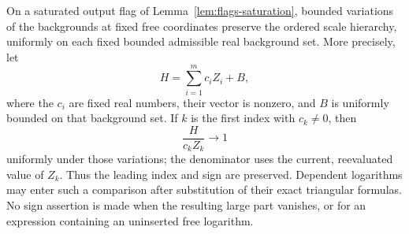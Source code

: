\begin{lemma}
\label{lem:flags-stability}
On a saturated output flag of Lemma~\ref{lem:flags-saturation}, bounded
variations of the backgrounds at fixed free coordinates preserve the ordered scale hierarchy,
uniformly on each fixed bounded admissible real background set. More
precisely, let
\[
 H=\sum_{i=1}^m c_iZ_i+B,
\]
where the $c_i$ are fixed real numbers, their vector is nonzero,
and $B$ is uniformly bounded on that background set. If $k$ is the
first index with $c_k\ne0$, then
\[
 \frac{H}{c_kZ_k}\longrightarrow1
\]
uniformly under those variations; the denominator uses the current,
reevaluated value of $Z_k$. Thus the leading index and sign are
preserved. Dependent logarithms may enter such a comparison after
substitution of their exact triangular formulas. No sign assertion
is made when the resulting large part vanishes, or for an expression
containing an uninserted free logarithm.
\end{lemma}

